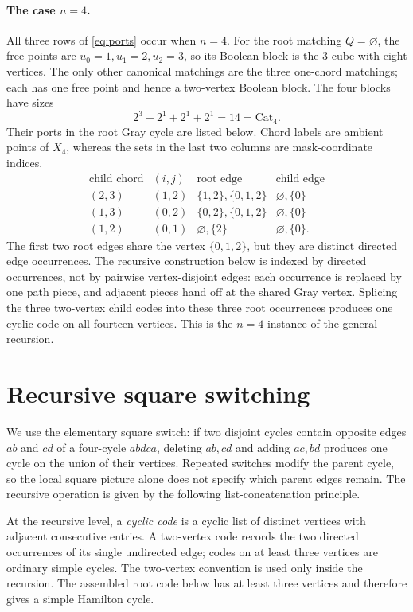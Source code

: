 \documentclass[12pt]{article}
\newcommand{\catalan}{\mathrm{Cat}}
\begin{document}
\paragraph{The case $n=4$.}
All three rows of \eqref{eq:ports} occur when $n=4$.  For the root matching
$Q=\varnothing$, the free points are
$u_0=1,u_1=2,u_2=3$, so its Boolean block is the $3$-cube with eight
vertices.  The only other canonical matchings are the three one-chord
matchings; each has one free point and hence a two-vertex Boolean block.  The
four blocks have sizes
\[
  2^3+2^1+2^1+2^1=14=\catalan_4.
\]
Their ports in the root Gray cycle are listed below.  Chord labels are
ambient points of $X_4$, whereas the sets in the last two columns are
mask-coordinate indices.
\[
\begin{array}{c|c|c|c}
\text{child chord}&(i,j)&\text{root edge}&\text{child edge}\\ \hline
(2,3)&(1,2)&\{1,2\},\{0,1,2\}&\varnothing,\{0\}\\
(1,3)&(0,2)&\{0,2\},\{0,1,2\}&\varnothing,\{0\}\\
(1,2)&(0,1)&\varnothing,\{2\}&\varnothing,\{0\}.
\end{array}
\]
The first two root edges share the vertex $\{0,1,2\}$, but they are distinct
directed edge occurrences.  The recursive construction below is indexed by
directed occurrences, not by pairwise vertex-disjoint edges: each
occurrence is replaced by one path piece, and adjacent pieces hand off at the
shared Gray vertex.  Splicing the three two-vertex child codes into these
three root occurrences produces one cyclic code on all fourteen vertices.
This is the $n=4$ instance of the general recursion.

\section{Recursive square switching}\label{sec:assembly}

We use the elementary square switch: if two disjoint cycles contain opposite
edges $ab$ and $cd$ of a four-cycle $a b d c a$, deleting $ab,cd$ and adding
$ac,bd$ produces one cycle on the union of their vertices.  Repeated switches
modify the parent cycle, so the local square picture alone does not specify
which parent edges remain.  The recursive operation is given by the following
list-concatenation principle.

At the recursive level, a \emph{cyclic code} is a cyclic list of distinct
vertices with adjacent consecutive entries.  A two-vertex code records the
two directed occurrences of its single undirected edge; codes on at least
three vertices are ordinary simple cycles.  The two-vertex convention is used
only inside the recursion.  The assembled root code below has at least three
vertices and therefore gives a simple Hamilton cycle.
\end{document}
